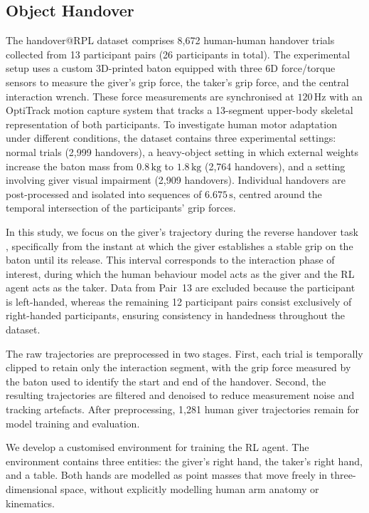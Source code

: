 \documentclass[journal]{IEEEtran}
\begin{document}
\subsection{Object Handover}\label{subsec:handoverDetails}

The handover@RPL dataset comprises 8,672 human-human handover trials collected from 13 participant pairs (26 participants in total). The experimental setup uses a custom 3D-printed baton equipped with three 6D force/torque sensors to measure the giver's grip force, the taker's grip force, and the central interaction wrench. These force measurements are synchronised at $120\,\mathrm{Hz}$ with an OptiTrack motion capture system that tracks a 13-segment upper-body skeletal representation of both participants. To investigate human motor adaptation under different conditions, the dataset contains three experimental settings: normal trials (2,999 handovers), a heavy-object setting in which external weights increase the baton mass from $0.8\,\mathrm{kg}$ to $1.8\,\mathrm{kg}$ (2,764 handovers), and a setting involving giver visual impairment (2,909 handovers). Individual handovers are post-processed and isolated into sequences of $6.675\,\mathrm{s}$, centred around the temporal intersection of the participants' grip forces.

In this study, we focus on the giver's trajectory during the reverse handover task \cite{khanna_MultimodalDataSet_2023}, specifically from the instant at which the giver establishes a stable grip on the baton until its release. This interval corresponds to the interaction phase of interest, during which the human behaviour model acts as the giver and the RL agent acts as the taker. Data from Pair~13 are excluded because the participant is left-handed, whereas the remaining 12 participant pairs consist exclusively of right-handed participants, ensuring consistency in handedness throughout the dataset.

The raw trajectories are preprocessed in two stages. First, each trial is temporally clipped to retain only the interaction segment, with the grip force measured by the baton used to identify the start and end of the handover. Second, the resulting trajectories are filtered and denoised to reduce measurement noise and tracking artefacts. After preprocessing, 1,281 human giver trajectories remain for model training and evaluation.

We develop a customised environment for training the RL agent. The environment contains three entities: the giver's right hand, the taker's right hand, and a table. Both hands are modelled as point masses that move freely in three-dimensional space, without explicitly modelling human arm anatomy or kinematics.
\end{document}

